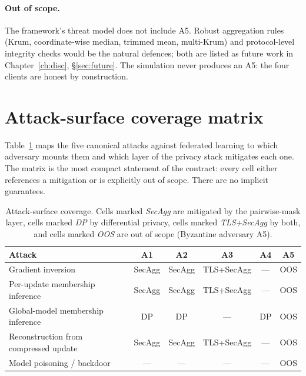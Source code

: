 \documentclass[11pt,a4paper]{report}
\begin{document}
\paragraph{Out of scope.} The framework's threat model does not include A5.
Robust aggregation rules (Krum, coordinate-wise median, trimmed mean,
multi-Krum) and protocol-level integrity checks would be the natural
defences; both are listed as future work in Chapter~\ref{ch:disc},
\S\ref{sec:future}. The simulation never produces an A5: the four clients
are honest by construction.

\section{Attack-surface coverage matrix}

Table~\ref{tab:attack-surface} maps the five canonical attacks against
federated learning to which adversary mounts them and which layer of the
privacy stack mitigates each one. The matrix is the most compact statement
of the contract: every cell either references a mitigation or is explicitly
out of scope. There are no implicit guarantees.

\begin{table}[h]
  \centering
  \caption{Attack-surface coverage. Cells marked \emph{SecAgg} are mitigated
  by the pairwise-mask layer, cells marked \emph{DP} by differential privacy,
  cells marked \emph{TLS+SecAgg} by both, and cells marked \emph{OOS} are
  out of scope (Byzantine adversary A5).}
  \label{tab:attack-surface}
  \begin{tabular}{lccccc}
    \toprule
    Attack & A1 & A2 & A3 & A4 & A5 \\
    \midrule
    Gradient inversion                    & SecAgg     & SecAgg     & TLS+SecAgg & ---  & OOS \\
    Per-update membership inference       & SecAgg     & SecAgg     & TLS+SecAgg & ---  & OOS \\
    Global-model membership inference     & DP         & DP         & ---        & DP   & OOS \\
    Reconstruction from compressed update & SecAgg     & SecAgg     & TLS+SecAgg & ---  & OOS \\
    Model poisoning / backdoor            & ---        & ---        & ---        & ---  & OOS \\
    \bottomrule
  \end{tabular}
\end{table}
\end{document}

